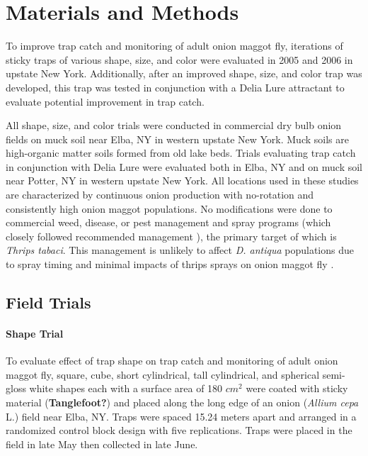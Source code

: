 \documentclass[alpha-refs]{wiley-article}
\begin{document}
\section{Materials and Methods}

To improve trap catch and monitoring of adult onion maggot fly, iterations of sticky traps of various shape, size, and color were evaluated in 2005 and 2006 in upstate New York.  Additionally, after an improved shape, size, and color trap was developed, this trap was tested in conjunction with a Delia Lure attractant to evaluate potential improvement in trap catch.  

All shape, size, and color trials were conducted in commercial dry bulb onion fields on muck soil near Elba, NY in western upstate New York. Muck soils are high-organic matter soils formed from old lake beds.  Trials evaluating trap catch in conjunction with Delia Lure were evaluated both in Elba, NY and on muck soil near Potter, NY in western upstate New York.  All locations used in these studies are characterized by continuous onion production with no-rotation and consistently high onion maggot populations.  No modifications were done to commercial weed, disease, or pest management and spray programs (which closely followed recommended management \citep{reiners2011integrated}), the primary target of which is \textit{Thrips tabaci}.  This management is unlikely to affect \textit{D. antiqua} populations due to spray timing and minimal impacts of thrips sprays on onion maggot fly \citep{finch1986behavior}. 

\subsection{Field Trials}

\paragraph{Shape Trial} To evaluate effect of trap shape on trap catch and monitoring of adult onion maggot fly, square, cube, short cylindrical, tall cylindrical, and spherical semi-gloss white shapes each with a surface area of 180 $cm^2$  were coated with sticky material (\textbf{Tanglefoot?}) and placed along the long edge of an onion (\textit{Allium cepa} L.) field near Elba, NY.  Traps were spaced 15.24 meters apart and arranged in a randomized control block design with five replications.  Traps were placed in the field in late May then collected in late June.   
\end{document}

